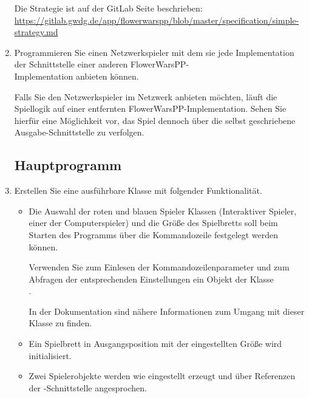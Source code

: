 \begin{enumerate}
Die Strategie ist auf der GitLab Seite beschrieben: \\
\href{https://gitlab.gwdg.de/app/flowerwarspp/blob/master/specification/simple-strategy.md}{https://gitlab.gwdg.de/app/flowerwarspp/blob/master/specification/simple-strategy.md}

\item Programmieren Sie einen Netzwerkspieler mit dem sie jede Implementation der Schnittstelle  einer anderen FlowerWarsPP- \\Implementation anbieten können.

Falls Sie den Netzwerkspieler im Netzwerk anbieten möchten, läuft die Spiellogik auf einer entfernten FlowerWarsPP-Implementation. Sehen Sie hierfür eine Möglichkeit vor, das Spiel dennoch über die selbst geschriebene Ausgabe-Schnittstelle zu verfolgen.


\subsection*{Hauptprogramm}
\item Erstellen Sie eine ausführbare Klasse mit folgender Funktionalität.
\begin{itemize}
\item Die Auswahl der roten und blauen Spieler Klassen (Interaktiver Spieler, einer der Computerspieler) und die Größe des Spielbretts soll beim Starten des Programms über die Kommandozeile festgelegt werden können.

Verwenden Sie zum Einlesen der Kommandozeilenparameter und zum Abfragen der entsprechenden Einstellungen ein Objekt der Klasse \\
.

In der Dokumentation sind nähere Informationen zum Umgang mit dieser Klasse zu finden.

\item Ein Spielbrett in Ausgangsposition mit der eingestellten Größe wird initialisiert.
\item Zwei Spielerobjekte werden wie eingestellt erzeugt und über Referenzen der -Schnittstelle angesprochen. 


\end{itemize}
\end{enumerate}
